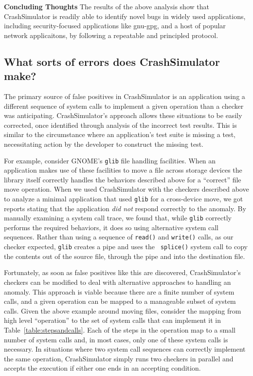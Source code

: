 {\bf Concluding Thoughts} The results of the above analysis show that
CrashSimulator is readily able to identify novel bugs in widely used
applications, including security-focused applications like gnu-gpg, and a host
of popular network applicaitons, by following a repeatable and principled
protocol.


\subsection{What sorts of errors does CrashSimulator make?}
\label{sec-sorts-errors}


The primary source of false positives in CrashSimulator is an application
using a different sequence of system calls to implement a given operation
than a checker was anticipating. CrashSimulator's approach allows these
situations to be easily corrected, once identified through analysis of the
incorrect test results.  This is similar to the circumstance where an
application's test suite is missing a test, necessitating action by the
developer to construct the missing test.

For example, consider GNOME's {\tt glib} file handling facilities.  When an
application makes use of these facilities to move a file across storage
devices the library itself correctly handles the behaviors described above
for a ``correct'' file move operation.  When we used CrashSimulator with
the checkers described above to analyze a minimal application that used
{\tt glib} for a cross-device move, we got reports stating that the
application {\em did not} respond correctly to the anomaly.  By manually
examining a system call trace, we found that, while {\tt glib} correctly
performs the required behaviors, it does so using alternative system call
sequences.  Rather than using a sequence of {\tt read()} and {\tt write()}
calls, as our checker expected, {\tt glib} creates a pipe and uses the {\tt
splice()} system call to copy the contents out of the source file, through
the pipe and into the destination file.

Fortunately, as soon as false positives like this are discovered,
CrashSimulator's checkers can be modified to deal with alternative
approaches to handling an anomaly.  This approach is viable because there
are a finite number of system calls, and a given operation can be mapped to
a manageable subset of system calls.  Given the above example around moving
files, consider the mapping from high level ``operation'' to the set of
system calls that can implement it in Table~\ref{table:stepsandcalls}.
Each of the steps in the operation map to a small number of system calls
and, in most cases, only one of these system calls is necessary.  In
situations where two system call sequences can correctly implement the same
operation, CrashSimulator simply runs two checkers in parallel and accepts
the execution if either one ends in an accepting condition.

